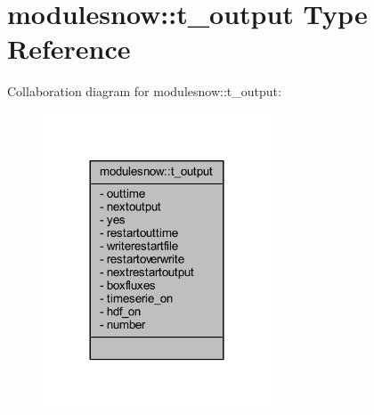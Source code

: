 \hypertarget{structmodulesnow_1_1t__output}{}\section{modulesnow\+:\+:t\+\_\+output Type Reference}
\label{structmodulesnow_1_1t__output}


Collaboration diagram for modulesnow\+:\+:t\+\_\+output\+:\nopagebreak
\begin{figure}[H]
\begin{center}
\leavevmode
\includegraphics[width=192pt]{structmodulesnow_1_1t__output__coll__graph}
\end{center}
\end{figure}

